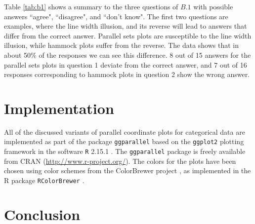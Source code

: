 Table \ref{tab:b1} shows a summary to the  three questions of $B.1$ with possible answers ``agree", ``disagree", and ``don't know".
The first two questions are  examples, where the line width illusion, and its reverse will lead to answers that differ from the correct answer. Parallel sets plots are susceptible to the line width illusion, while hammock plots suffer from the reverse. The data shows that in about 50\% of the responses we can see this difference. 8 out of 15 answers for the parallel sets plots in question 1 deviate from the correct answer, and 7 out of 16 responses corresponding to hammock plots in question 2 show the wrong answer.





\section{Implementation}

All  of the discussed variants of parallel coordinate plots for categorical data are implemented as part of the package {\tt ggparallel} based on the {\tt ggplot2} \cite{ggplot2} plotting framework in the software {\tt R} 2.15.1 \citep{R}. The  {\tt ggparallel} package is freely available from CRAN (\url{http://www.r-project.org/}).
The colors for the plots have been chosen using color schemes from the ColorBrewer project  \cite{colorbrewer} , as implemented in the R package {\tt RColorBrewer}  \cite{RColorBrewer} .


\section{Conclusion}





